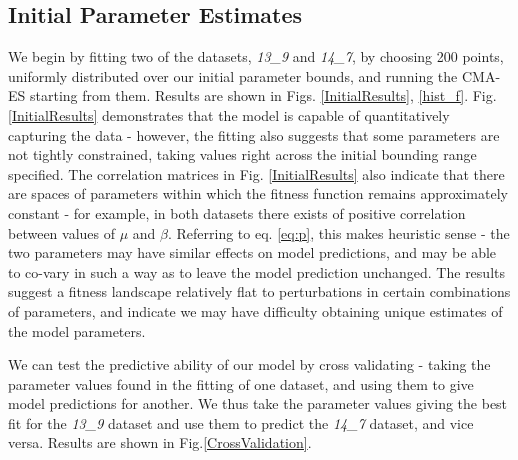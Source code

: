 \documentclass[10pt,journal]{./IEEE_latex_class/IEEEtran}
\begin{document}
\subsection{Initial Parameter Estimates}
\label{Initial Parameter Estimates}


 We begin by fitting two of the datasets, \textit{13\_9} and \textit{14\_7}, by choosing 200 points, uniformly distributed over our initial parameter bounds, and running the CMA-ES starting from them. Results are shown in Figs. \ref{InitialResults}, \ref{hist_f}. Fig. \ref{InitialResults} demonstrates that the model is capable of quantitatively capturing the data - however, the fitting also suggests that some parameters are not tightly constrained, taking values right across the initial bounding range specified. The correlation matrices in Fig. \ref{InitialResults} also indicate that there are spaces of parameters within which the fitness function remains approximately constant - for example, in both datasets there exists of positive correlation between values of $\mu$ and $\beta$. Referring to eq. \ref{eq:p}, this makes heuristic sense - the two parameters may have similar effects on model predictions, and may be able to co-vary in such a way as to leave the model prediction unchanged. The results suggest a fitness landscape relatively flat to perturbations in certain combinations of parameters, and indicate we may have difficulty obtaining unique estimates of the model parameters.
 
 We can test the predictive ability of our model by cross validating - taking the parameter values found in the fitting of one dataset, and using them to give model predictions for another. We thus take the parameter values giving the best fit for the  \textit{13\_9} dataset and use them to predict the \textit{14\_7} dataset, and vice versa. Results are shown in Fig.\ref{CrossValidation}.
 
\end{document}
